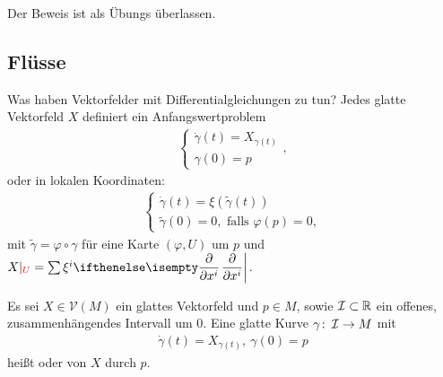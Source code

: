 Der Beweis ist als Übungs überlassen.


\subsection{Flüsse}

Was haben Vektorfelder mit Differentialgleichungen zu tun? Jedes glatte Vektorfeld $X$ definiert ein Anfangswertproblem
\begin{align*}
  \begin{cases}
    \dot \gamma(t) = X_{\gamma(t)}\\
    \gamma(0) = p
  \end{cases},
\end{align*}
oder in lokalen Koordinaten:
\begin{align*}
\begin{cases}
  \dot \gamma(t) = \xi(\tilde \gamma(t))\\
  \tilde \gamma(0) = 0, \text{ falls } \varphi(p) = 0,
\end{cases}
\end{align*}
mit $\tilde \gamma = \varphi \circ \gamma$ für eine Karte $(\varphi,U)$ um $p$ und $X|_{\textcolor{red}{U}} = \sum \xi^i \pdifffrac{}{x^i}$.

\begin{dfn}
  Es sei $X \in \mathcal V(M)$ ein glattes Vektorfeld und $p \in M$, sowie $\operatorname{\mathcal{I}} \subset \operatorname{\mathbb{R}}$ ein offenes, zusammenhängendes Intervall um $0$. Eine glatte Kurve $\gamma \colon \operatorname{\mathcal{I}} \to M$ mit
  \begin{align*}
    \dot \gamma(t) = X_{\gamma(t)}, \ \gamma(0) = p
  \end{align*}
heißt  oder  von $X$ durch $p$.
\end{dfn}

